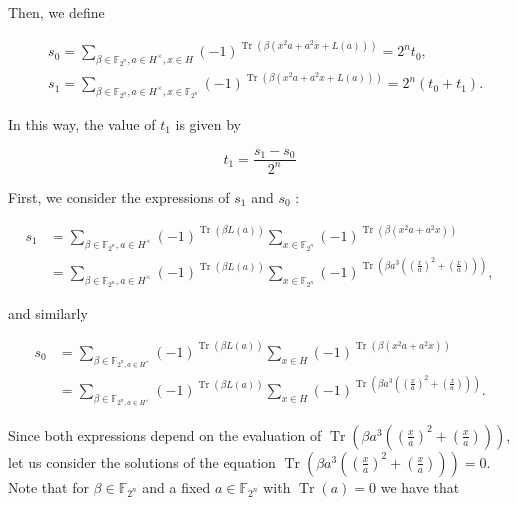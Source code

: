 \documentclass[10pt]{article}
\begin{document}
Then, we define

$$
\begin{aligned}
& s_{0}=\sum_{\beta \in \mathbb{F}_{2^{n}}, a \in H^{\times}, x \in H}(-1)^{\operatorname{Tr}\left(\beta\left(x^{2} a+a^{2} x+L(a)\right)\right)}=2^{n} t_{0}, \\
& s_{1}=\sum_{\beta \in \mathbb{F}_{2^{n}}, a \in H^{\times}, x \in \mathbb{F}_{2^{n}}}(-1)^{\operatorname{Tr}\left(\beta\left(x^{2} a+a^{2} x+L(a)\right)\right)}=2^{n}\left(t_{0}+t_{1}\right) .
\end{aligned}
$$

In this way, the value of $t_{1}$ is given by

$$
t_{1}=\frac{s_{1}-s_{0}}{2^{n}}
$$

First, we consider the expressions of $s_{1}$ and $s_{0}$ :


\begin{align*}
s_{1} & =\sum_{\beta \in \mathbb{F}_{2^{n}}, a \in H^{\times}}(-1)^{\operatorname{Tr}(\beta L(a))} \sum_{x \in \mathbb{F}_{2^{n}}}(-1)^{\operatorname{Tr}\left(\beta\left(x^{2} a+a^{2} x\right)\right)} \\
& =\sum_{\beta \in \mathbb{F}_{2^{n}}, a \in H^{\times}}(-1)^{\operatorname{Tr}(\beta L(a))} \sum_{x \in \mathbb{F}_{2^{n}}}(-1)^{\operatorname{Tr}\left(\beta a^{3}\left(\left(\frac{x}{a}\right)^{2}+\left(\frac{x}{a}\right)\right)\right)}, \tag{3.5}
\end{align*}


and similarly


\begin{align*}
s_{0} & =\sum_{\beta \in \mathbb{F}_{2^{n}, a \in H^{\times}}}(-1)^{\operatorname{Tr}(\beta L(a))} \sum_{x \in H}(-1)^{\operatorname{Tr}\left(\beta\left(x^{2} a+a^{2} x\right)\right)} \\
& =\sum_{\beta \in \mathbb{F}_{2^{n}, a \in H^{\times}}}(-1)^{\operatorname{Tr}(\beta L(a))} \sum_{x \in H}(-1)^{\operatorname{Tr}\left(\beta a^{3}\left(\left(\frac{x}{a}\right)^{2}+\left(\frac{x}{a}\right)\right)\right)} . \tag{3.6}
\end{align*}


Since both expressions depend on the evaluation of $\operatorname{Tr}\left(\beta a^{3}\left(\left(\frac{x}{a}\right)^{2}+\left(\frac{x}{a}\right)\right)\right)$, let us consider the solutions of the equation $\operatorname{Tr}\left(\beta a^{3}\left(\left(\frac{x}{a}\right)^{2}+\left(\frac{x}{a}\right)\right)\right)=0$. Note that for $\beta \in \mathbb{F}_{2^{n}}$ and a fixed $a \in \mathbb{F}_{2^{n}}$ with $\operatorname{Tr}(a)=0$ we have that
\end{document}
